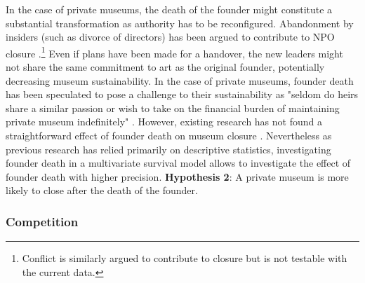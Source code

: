 \documentclass[12pt]{article}
\begin{document}
In the case of private museums, the death of the founder might constitute a substantial transformation as authority has to be reconfigured.
Abandonment by insiders (such as divorce of directors) has been argued to contribute to NPO closure \parencite{Duckles_Hager_Galaskiewicz_2005_close}.\footnote{Conflict is similarly argued to contribute to closure but is not testable with the current data.}
Even if plans have been made for a handover, the new leaders might not share the same commitment to art as the original founder, potentially decreasing museum sustainability. 
In the case of private museums, founder death has been speculated to pose a challenge to their sustainability as "seldom do heirs share a similar passion or wish to take on the financial burden of maintaining private museum indefinitely" \parencite[p.234]{Walker_2019_collector}.
However, existing research has not found a straightforward effect of founder death on museum closure \parencite{Velthuis_Gera_forthcoming_fragility,Velthuis_etal_2023_boom}.
Nevertheless as previous research has relied primarily on descriptive statistics, investigating founder death in a multivariate survival model allows to investigate the effect of founder death with higher precision.
\bigbreak
\noindent
\textbf{Hypothesis 2}: A private museum is more likely to close after the death of the founder.



\subsubsection*{Competition}
\label{sec:org9840956}
\end{document}
